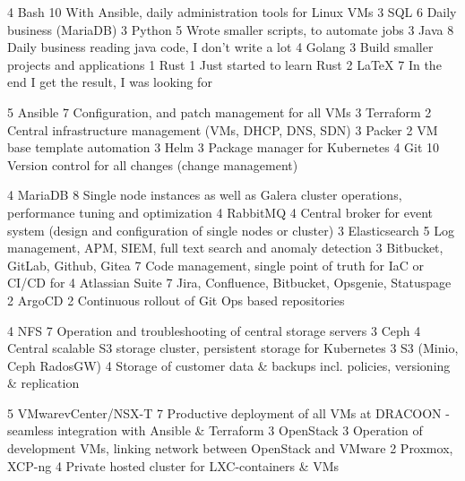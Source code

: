 \documentclass[11pt,a4paper,sans,final]{moderncv}
\begin{document}
						{4}	{Bash}								{10}	{With Ansible, daily administration tools for Linux VMs}
		\cvskillentry		{}						{3}	{SQL}								{6}		{Daily business (MariaDB)}
		\cvskillentry		{}						{3}	{Python}							{5}		{Wrote smaller scripts, to automate jobs}
		\cvskillentry		{}						{3}	{Java}								{8}		{Daily business reading java code, I don't write a lot}
		\cvskillentry		{}						{4}	{Golang}							{3}		{Build smaller projects and applications}
		\cvskillentry		{}						{1}	{Rust}								{1}		{Just started to learn Rust}
		\cvskillentry		{}						{2}	{\LaTeX}							{7}		{In the end I get the result, I was looking for}

						{5}	{Ansible}							{7}		{Configuration, and patch management for all VMs}
		\cvskillentry		{}						{3}	{Terraform}							{2}		{Central infrastructure management (VMs, DHCP, DNS, SDN)}
		\cvskillentry		{}						{3}	{Packer}							{2}		{VM base template automation}
		\cvskillentry		{}						{3}	{Helm}								{3}		{Package manager for Kubernetes}
		\cvskillentry		{}						{4}	{Git}								{10}	{Version control for all changes (change management)}
		
						{4}	{MariaDB}							{8}		{Single node instances as well as Galera cluster operations, performance tuning and optimization}
		\cvskillentry		{}						{4}	{RabbitMQ}							{4}		{Central broker for event system (design and configuration of single nodes or cluster)}
		\cvskillentry		{}						{3}	{Elasticsearch}						{5}		{Log management, APM, SIEM, full text search and anomaly detection}
		\cvskillentry		{}						{3}	{Bitbucket, GitLab, Github, Gitea}	{7}		{Code management, single point of truth for IaC or CI/CD for}
		\cvskillentry		{}						{4}	{Atlassian Suite}					{7}		{Jira, Confluence, Bitbucket, Opsgenie, Statuspage}
		\cvskillentry		{}						{2}	{ArgoCD}							{2}		{Continuous rollout of Git Ops based repositories}

						{4}	{NFS}								{7}		{Operation and troubleshooting of central storage servers}
		\cvskillentry		{}						{3}	{Ceph}								{4}		{Central scalable S3 storage cluster, persistent storage for Kubernetes}
		\cvskillentry		{}						{3}	{S3 (Minio, Ceph RadosGW)}			{4}		{Storage of customer data \& backups incl. policies, versioning \& replication}
		
				{5}	{VMware\newline vCenter/NSX-T}		{7}		{Productive deployment of all VMs at DRACOON - seamless integration with Ansible \& Terraform}
		\cvskillentry		{}						{3}	{OpenStack}							{3}		{Operation of development VMs, linking network between OpenStack and  VMware}
		\cvskillentry		{}						{2}	{Proxmox, XCP-ng}					{4}		{Private hosted cluster for LXC-containers \& VMs}
		
\end{document}
